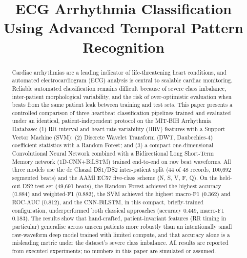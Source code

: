 \documentclass[conference]{IEEEtran}
\begin{document}
\title{ECG Arrhythmia Classification Using Advanced Temporal Pattern Recognition}

\author{
}

\maketitle

\begin{abstract}
Cardiac arrhythmias are a leading indicator of life-threatening heart
conditions, and automated electrocardiogram (ECG) analysis is central to
scalable cardiac monitoring. Reliable automated classification remains
difficult because of severe class imbalance, inter-patient morphological
variability, and the risk of over-optimistic evaluation when beats from the
same patient leak between training and test sets. This paper presents a
controlled comparison of three heartbeat classification pipelines trained
and evaluated under an identical, patient-independent protocol on the
MIT-BIH Arrhythmia Database: (1) RR-interval and heart-rate-variability
(HRV) features with a Support Vector Machine (SVM); (2) Discrete Wavelet
Transform (DWT, Daubechies-4) coefficient statistics with a Random Forest;
and (3) a compact one-dimensional Convolutional Neural Network combined
with a Bidirectional Long Short-Term Memory network (1D-CNN+BiLSTM) trained
end-to-end on raw beat waveforms. All three models use the de Chazal
DS1/DS2 inter-patient split (44 of 48 records, 100{,}692 segmented beats)
and the AAMI EC57 five-class scheme (N, S, V, F, Q). On the held-out DS2
test set (49{,}691 beats), the Random Forest achieved the highest accuracy
(0.884) and weighted-F1 (0.882), the SVM achieved the highest macro-F1
(0.362) and ROC-AUC (0.812), and the CNN-BiLSTM, in this compact,
briefly-trained configuration, underperformed both classical approaches
(accuracy 0.449, macro-F1 0.183). The results show that hand-crafted,
patient-invariant features (RR timing in particular) generalise across
unseen patients more robustly than an intentionally small raw-waveform deep
model trained with limited compute, and that accuracy alone is a misleading
metric under the dataset's severe class imbalance. All results are
reported from executed experiments; no numbers in this paper are
simulated or assumed.
\end{abstract}
\end{document}
